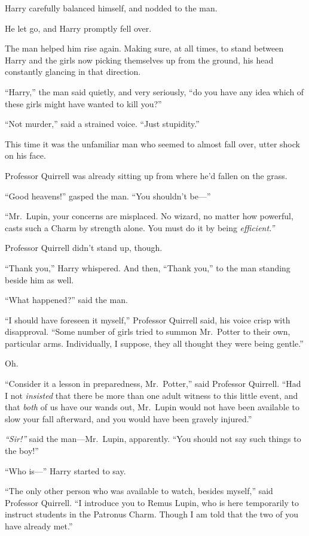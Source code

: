 Harry carefully balanced himself, and nodded to the man.

He let go, and Harry promptly fell over.

The man helped him rise again. Making sure, at all times, to stand
between Harry and the girls now picking themselves up from the ground,
his head constantly glancing in that direction.

``Harry,'' the man said quietly, and very seriously, ``do you have any
idea which of these girls might have wanted to kill you?''

``Not murder,'' said a strained voice. ``Just stupidity.''

This time it was the unfamiliar man who seemed to almost fall over,
utter shock on his face.

Professor Quirrell was already sitting up from where he'd fallen on the
grass.

``Good heavens!'' gasped the man. ``You shouldn't be---''

``Mr.~Lupin, your concerns are misplaced. No wizard, no matter how
powerful, casts such a Charm by strength alone. You must do it by being
\emph{efficient.''}

Professor Quirrell didn't stand up, though.

``Thank you,'' Harry whispered. And then, ``Thank you,'' to the man
standing beside him as well.

``What happened?'' said the man.

``I should have foreseen it myself,'' Professor Quirrell said, his voice
crisp with disapproval. ``Some number of girls tried to summon
Mr.~Potter to their own, particular arms. Individually, I suppose, they
all thought they were being gentle.''

Oh.

``Consider it a lesson in preparedness, Mr.~Potter,'' said Professor
Quirrell. ``Had I not \emph{insisted} that there be more than one adult
witness to this little event, and that \emph{both} of us have our wands
out, Mr.~Lupin would not have been available to slow your fall
afterward, and you would have been gravely injured.''

\emph{``Sir!''} said the man---Mr.~Lupin, apparently. ``You should not
say such things to the boy!''

``Who is---'' Harry started to say.

``The only other person who was available to watch, besides myself,''
said Professor Quirrell. ``I introduce you to Remus Lupin, who is here
temporarily to instruct students in the Patronus Charm. Though I am told
that the two of you have already met.''

